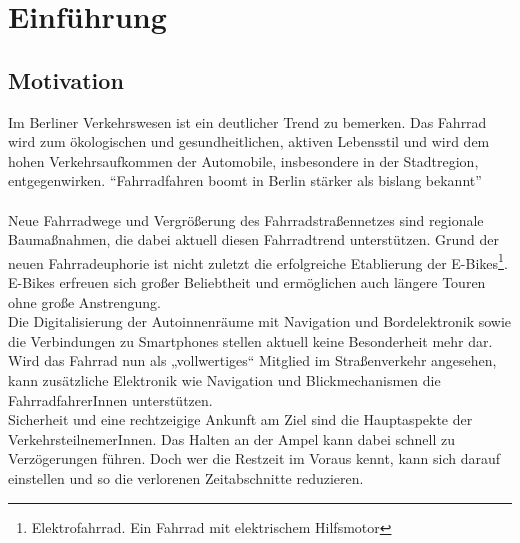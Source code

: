 \chapter{Einführung}
\section{Motivation}
Im Berliner Verkehrswesen ist ein deutlicher Trend zu bemerken. Das Fahrrad wird zum ökologischen und gesundheitlichen, aktiven Lebensstil und wird dem hohen Verkehrsaufkommen der Automobile, insbesondere in der Stadtregion, entgegenwirken. “Fahrradfahren boomt in Berlin stärker als bislang bekannt”\cite{Mopo}\\\\
Neue Fahrradwege und Vergrößerung des Fahrradstraßennetzes sind regionale Baumaßnahmen, die dabei aktuell diesen Fahrradtrend unterstützen. Grund der neuen Fahrradeuphorie ist nicht zuletzt die erfolgreiche Etablierung der E-Bikes\footnote{ Elektrofahrrad. Ein Fahrrad mit elektrischem Hilfsmotor}. E-Bikes erfreuen sich großer Beliebtheit und ermöglichen auch längere Touren ohne große Anstrengung.\\ 
Die Digitalisierung der Autoinnenräume mit Navigation und Bordelektronik sowie die Verbindungen zu \glspl{Smartphone} stellen aktuell keine Besonderheit mehr dar. Wird das Fahrrad nun als „vollwertiges“ Mitglied im Straßenverkehr angesehen, kann zusätzliche Elektronik wie Navigation und Blickmechanismen die FahrradfahrerInnen unterstützen.\\
Sicherheit und eine rechtzeigige Ankunft am Ziel sind die Hauptaspekte der VerkehrsteilnemerInnen. Das Halten an der Ampel kann dabei schnell zu Verzögerungen führen. Doch wer die Restzeit im Voraus kennt, kann sich darauf einstellen und so die verlorenen Zeitabschnitte reduzieren.
